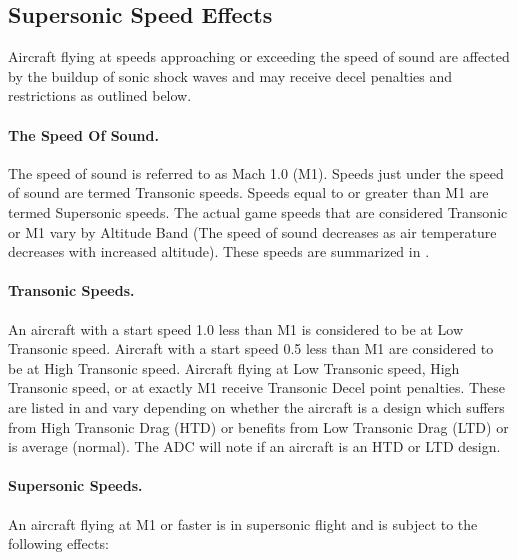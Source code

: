 \begin{advancedrules}
\section{Supersonic Speed Effects}
\label{rule:supersonic-speed-effects}


Aircraft flying at speeds approaching or exceeding the speed of sound are affected by the buildup of sonic shock waves and may receive decel penalties and restrictions as outlined below.

\paragraph{The Speed Of Sound.} 
The speed of sound is referred to as Mach 1.0 (M1). Speeds just under the speed of sound are termed Transonic speeds. Speeds equal to or greater than M1 are termed Supersonic speeds. The actual game speeds that are considered Transonic or M1 vary by Altitude Band (The speed of sound decreases as air temperature decreases with increased altitude). These speeds are summarized in .

\paragraph{Transonic Speeds.} 
An aircraft with a start speed 1.0 less than M1 is considered to be at Low Transonic speed. Aircraft with a start speed 0.5 less than M1 are considered to be at High Transonic speed. Aircraft flying at Low Transonic speed, High Transonic speed, or at exactly M1 receive Transonic Decel point penalties. These are listed in  and vary depending on whether the aircraft is a design which suffers from High Transonic Drag (HTD) or benefits from Low Transonic Drag (LTD) or is average (normal). The ADC will note if an aircraft is an HTD or LTD design.


\paragraph{Supersonic Speeds.} 
An aircraft flying at M1 or faster is in supersonic flight and is subject to the following effects:


\end{advancedrules}
